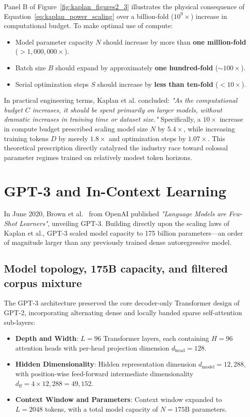 \documentclass[../../main.tex]{subfiles}
\begin{document}
Panel B of Figure~\ref{fig:kaplan_figures2_3} illustrates the physical consequence of Equation~\eqref{eq:kaplan_power_scaling} over a billion-fold ($10^9\times$) increase in computational budget. To make optimal use of compute:
\begin{itemize}
    \item Model parameter capacity $N$ should increase by more than \textbf{one million-fold} ($> 1,000,000\times$).
    \item Batch size $B$ should expand by approximately \textbf{one hundred-fold} ($\sim 100\times$).
    \item Serial optimization steps $S$ should increase by \textbf{less than ten-fold} ($< 10\times$).
\end{itemize}

In practical engineering terms, Kaplan et al. concluded: \emph{"As the computational budget $C$ increases, it should be spent primarily on larger models, without dramatic increases in training time or dataset size."} Specifically, a $10\times$ increase in compute budget prescribed scaling model size $N$ by $5.4\times$, while increasing training tokens $D$ by merely $1.8\times$ and optimization steps by $1.07\times$. This theoretical prescription directly catalyzed the industry race toward colossal parameter regimes trained on relatively modest token horizons.


\section{GPT-3 and In-Context Learning}
\label{sec:gpt3_in_context_learning}

In June 2020, Brown et al.~\cite{brown2020} from OpenAI published \emph{"Language Models are Few-Shot Learners"}, unveiling GPT-3. Building directly upon the scaling laws of Kaplan et al., GPT-3 scaled model capacity to 175 billion parameters—an order of magnitude larger than any previously trained dense autoregressive model.


\subsection{Model topology, 175B capacity, and filtered corpus mixture}
\label{subsec:gpt3_setup}

The GPT-3 architecture preserved the core decoder-only Transformer design of GPT-2, incorporating alternating dense and locally banded sparse self-attention sub-layers:
\begin{itemize}
    \item \textbf{Depth and Width}: $L = 96$ Transformer layers, each containing $H = 96$ attention heads with per-head projection dimension $d_{\text{head}} = 128$.
    \item \textbf{Hidden Dimensionality}: Hidden representation dimension $d_{\text{model}} = 12,288$, with position-wise feed-forward intermediate dimensionality $d_{\text{ff}} = 4 \times 12,288 = 49,152$.
    \item \textbf{Context Window and Parameters}: Context window expanded to $L = 2048$ tokens, with a total model capacity of $N = 175\text{B}$ parameters.
\end{itemize}
\end{document}

